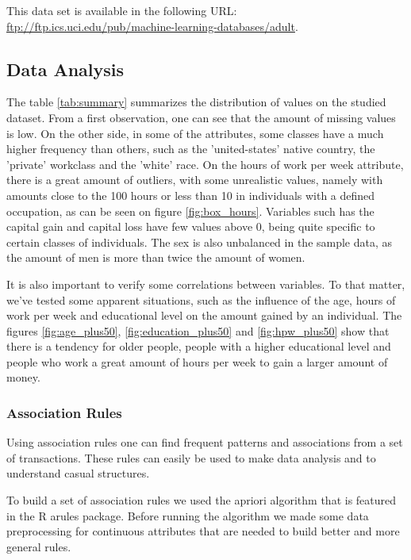\documentclass[a4paper]{llncs}
\begin{document}
This data set is available in the following URL: \url{ftp://ftp.ics.uci.edu/pub/machine-learning-databases/adult}.

\subsection{Data Analysis}

The table \ref{tab:summary} summarizes the distribution of values on the studied
dataset. From a first observation, one can see that the amount of missing values
is low. On the other side, in some of the attributes, some classes have a
much higher frequency than others, such as the 'united-states' native country, 
the 'private' workclass and the 'white' race. On the hours of work per week
attribute, there is a great amount of outliers, with some unrealistic
values, namely with amounts close to the 100 hours or less than 10 in 
individuals with a defined occupation, as can be seen on figure 
\ref{fig:box_hours}. Variables such has the capital gain and capital loss have
few values above 0, being quite specific to certain classes of individuals. The
sex is also unbalanced in the sample data, as the amount of men is more than
twice the amount of women.

It is also important to verify some correlations between variables. To that
matter, we've tested some apparent situations, such as the influence of the age,
hours of work per week and educational level on the amount gained by an
individual. The figures \ref{fig:age_plus50}, \ref{fig:education_plus50} and
\ref{fig:hpw_plus50} show that there is a tendency for older people, people with
a higher educational level and people who work a great amount of hours per week
to gain a larger amount of money.

\subsubsection{Association Rules}

Using association rules one can find frequent patterns and associations from a
set of transactions. These rules can easily be used to make data analysis and
to understand casual structures.

To build a set of association rules we used the apriori algorithm that is featured
in the R \cite{6} arules \cite{7} package. Before running the algorithm we made some data preprocessing
for continuous attributes that are needed to build better and more general rules.
\end{document}
